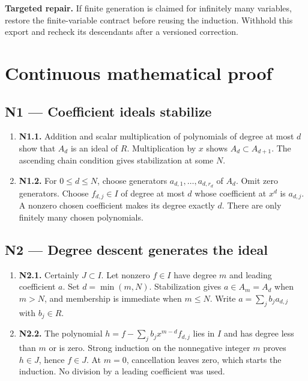 \documentclass[preprint,12pt,aps,pra,showkeys,amsmath,amssymb,superscriptaddress,floatfix]{revtex4-2}
\theoremstyle{definition}
\theoremstyle{remark}
\newcommand{\field}[2]{\par\smallskip\noindent\textbf{#1.} #2\par}
\begin{document}
\field{Targeted repair}{If finite generation is claimed for infinitely many variables, restore
the finite-variable contract before reusing the induction. Withhold this
export and recheck its descendants after a versioned correction.}

\endgroup\clearpage\section{Continuous mathematical proof}\label{sec:proof}

\subsection{N1 --- Coefficient ideals
stabilize}\label{n1-coefficient-ideals-stabilize}

\begin{enumerate}
\def\labelenumi{\arabic{enumi}.}
\item
  \textbf{N1.1.} Addition and scalar multiplication of polynomials of
  degree at most \(d\) show that \(A_d\) is an ideal of \(R\).
  Multiplication by \(x\) shows \(A_d\subset A_{d+1}\). The ascending
  chain condition gives stabilization at some \(N\).
\item
  \textbf{N1.2.} For \(0\le d\le N\), choose generators
  \(a_{d,1},\ldots,a_{d,r_d}\) of \(A_d\). Omit zero generators. Choose
  \(f_{d,j}\in I\) of degree at most \(d\) whose coefficient at \(x^d\)
  is \(a_{d,j}\). A nonzero chosen coefficient makes its degree exactly
  \(d\). There are only finitely many chosen polynomials.
\end{enumerate}

\subsection{N2 --- Degree descent generates the
ideal}\label{n2-degree-descent-generates-the-ideal}

\begin{enumerate}
\def\labelenumi{\arabic{enumi}.}
\item
  \textbf{N2.1.} Certainly \(J\subset I\). Let nonzero \(f\in I\) have
  degree \(m\) and leading coefficient \(a\). Set \(d=\min(m,N)\).
  Stabilization gives \(a\in A_m=A_d\) when \(m>N\), and membership is
  immediate when \(m\le N\). Write \(a=\sum_j b_j a_{d,j}\) with
  \(b_j\in R\).
\item
  \textbf{N2.2.} The polynomial \(h=f-\sum_j b_j x^{m-d}f_{d,j}\) lies
  in \(I\) and has degree less than \(m\) or is zero. Strong induction
  on the nonnegative integer \(m\) proves \(h\in J\), hence \(f\in J\).
  At \(m=0\), cancellation leaves zero, which starts the induction. No
  division by a leading coefficient was used.
\end{enumerate}
\end{document}
